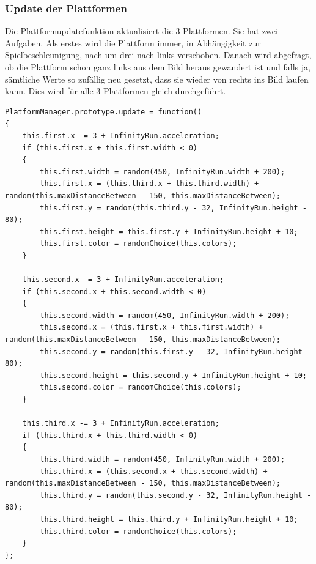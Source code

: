 \subsubsection{Update der Plattformen}
Die Plattformupdatefunktion aktualisiert die 3 Plattformen. Sie hat zwei Aufgaben. Als erstes wird die Plattform immer, in Abhängigkeit zur Spielbeschleunigung, nach um drei nach links verschoben. Danach wird abgefragt, ob die Plattform schon ganz links aus dem Bild heraus gewandert ist und falls ja, sämtliche Werte so zufällig neu gesetzt, dass sie wieder von rechts ins Bild laufen kann. Dies wird für alle 3 Plattformen gleich durchgeführt.
\lstset{language=java}
\begin{lstlisting}[frame=single]
PlatformManager.prototype.update = function() 
{
	this.first.x -= 3 + InfinityRun.acceleration;
	if (this.first.x + this.first.width < 0) 
	{
		this.first.width = random(450, InfinityRun.width + 200);
		this.first.x = (this.third.x + this.third.width) + random(this.maxDistanceBetween - 150, this.maxDistanceBetween);
		this.first.y = random(this.third.y - 32, InfinityRun.height - 80);
		this.first.height = this.first.y + InfinityRun.height + 10;
		this.first.color = randomChoice(this.colors);
	}

	this.second.x -= 3 + InfinityRun.acceleration;
	if (this.second.x + this.second.width < 0) 
	{
		this.second.width = random(450, InfinityRun.width + 200);
		this.second.x = (this.first.x + this.first.width) + random(this.maxDistanceBetween - 150, this.maxDistanceBetween);
		this.second.y = random(this.first.y - 32, InfinityRun.height - 80);
		this.second.height = this.second.y + InfinityRun.height + 10;
		this.second.color = randomChoice(this.colors);
	}

	this.third.x -= 3 + InfinityRun.acceleration;
	if (this.third.x + this.third.width < 0) 
	{
		this.third.width = random(450, InfinityRun.width + 200);
		this.third.x = (this.second.x + this.second.width) + random(this.maxDistanceBetween - 150, this.maxDistanceBetween);
		this.third.y = random(this.second.y - 32, InfinityRun.height - 80);
		this.third.height = this.third.y + InfinityRun.height + 10;
		this.third.color = randomChoice(this.colors);
	}
};
\end{lstlisting}
